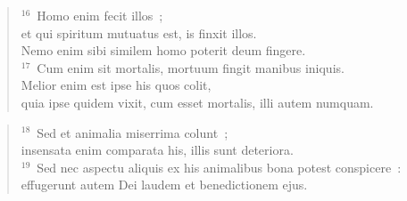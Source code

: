 \begin{verse}
${}^{16}$~Homo enim fecit illos~;\\ et qui spiritum mutuatus est, is finxit illos.\\ Nemo enim sibi similem homo poterit deum fingere.\\
${}^{17}$~Cum enim sit mortalis, mortuum fingit manibus iniquis.\\ Melior enim est ipse his quos colit,\\ quia ipse quidem vixit, cum esset mortalis, illi autem numquam.\end{verse}


\begin{verse}${}^{18}$~Sed et animalia miserrima colunt~;\\ insensata enim comparata his, illis sunt deteriora.\\
${}^{19}$~Sed nec aspectu aliquis ex his animalibus bona potest conspicere~:\\ effugerunt autem Dei laudem et benedictionem ejus.\end{verse}


